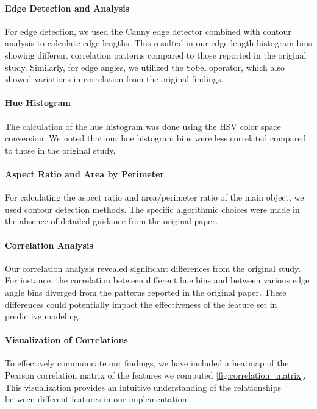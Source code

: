 \paragraph{Edge Detection and Analysis}
For edge detection, we used the Canny edge detector\supercite{canny1986computational} combined with contour analysis to calculate edge lengths. This resulted in our edge length histogram bins showing different correlation patterns compared to those reported in the original study. Similarly, for edge angles, we utilized the Sobel operator\supercite{kanopoulos1988design}, which also showed variations in correlation from the original findings.

\paragraph{Hue Histogram}
The calculation of the hue histogram was done using the HSV color space conversion. We noted that our hue histogram bins were less correlated compared to those in the original study.

\paragraph{Aspect Ratio and Area by Perimeter}
For calculating the aspect ratio and area/perimeter ratio of the main object, we used contour detection methods. The specific algorithmic choices were made in the absence of detailed guidance from the original paper.

\paragraph{Correlation Analysis}
Our correlation analysis revealed significant differences from the original study. For instance, the correlation between different hue bins and between various edge angle bins diverged from the patterns reported in the original paper. These differences could potentially impact the effectiveness of the feature set in predictive modeling.

\paragraph{Visualization of Correlations}
To effectively communicate our findings, we have included a heatmap of the Pearson correlation matrix of the features we computed \ref{fig:correlation_matrix}. This visualization provides an intuitive understanding of the relationships between different features in our implementation.


